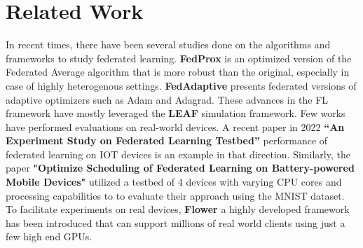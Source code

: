 \section{Related Work}
    In recent times, there have been several studies done on the algorithms and frameworks to study federated learning. \textbf{FedProx} is an optimized version of the Federated Average algorithm that is more robust than the original, especially in case of highly heterogenous settings. \textbf{FedAdaptive} presents federated versions of adaptive optimizers such as Adam and Adagrad. These advances in the FL framework have mostly leveraged the \textbf{LEAF} simulation framework. Few works have performed evaluations on real-world devices. A recent paper in 2022 \textbf{“An Experiment Study on Federated Learning Testbed”} performance of federated learning on IOT devices is an example in that direction. Similarly, the paper \textbf{"Optimize Scheduling of Federated Learning on Battery-powered Mobile Devices"} utilized a testbed of 4 devices with varying CPU cores and processing capabilities to to evaluate their approach using the MNIST dataset. To facilitate experiments on real devices, \textbf{Flower} a highly developed framework has been introduced that can support millions of real world clients using just a few high end GPUs.

